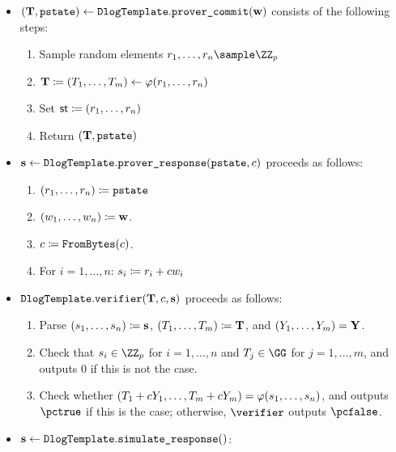 \documentclass[11pt]{article}
\begin{document}
\begin{itemize}
  \item\label{item:basic:p1}
   $(\mathbf {T}, \texttt{pstate}) \gets \texttt{DlogTemplate}.\texttt{prover\_commit}(\mathbf {w})$ consists of the following steps:
    \begin{enumerate}
      \item\label{item:basic:p1:randomness}
        Sample random elements $r_1,\dots,r_n\sample\ZZ_p$
      \item
         $\mathbf {T} \coloneqq (T_1,\dots,T_m)\gets\varphi(r_1,\dots,r_n)$
      \item Set $\mathsf{st}\coloneqq (r_1,\dots,r_n)$
      \item
        Return $(\mathbf {T},\texttt{pstate})$
    \end{enumerate}
  \item\label{item:basic:p2}
    $\mathbf {s} \gets \texttt{DlogTemplate}.\texttt{prover\_response}(\texttt{pstate},c)$ proceeds as follows:
    \begin{enumerate}
      \item  $(r_1,\dots,r_n)\coloneqq \texttt{pstate}$
      \item  $(w_1,\dots,w_n)\coloneqq \mathbf {w}$.
      \item
        $c \coloneqq \texttt{FromBytes}(c)$.
      \item For $i=1,\dots,n$: $s_i\coloneqq r_i+cw_i$
    \end{enumerate}
  \item\label{item:basic:v}
     $\texttt{DlogTemplate}.\texttt{verifier}(\mathbf {T},c,\mathbf {s})$ proceeds as follows:
    \begin{enumerate}
      \item Parse $(s_1, \dots, s_n) \coloneqq \mathbf {s}$, $(T_1, \dots, T_m) \coloneqq \mathbf {T}$, and $(Y_1, \dots, Y_m) = \mathbf {Y}$.
      \item\label{item:basic:v:checks}
        Check that $\response_i\in\ZZ_p$ for $i=1,\dots,n$ and $\commitment_j\in\GG$ for $j=1,\dots,m$, and outputs $0$ if this is not the case.
      \item Check whether $(T_1 + cY_1,\dots,T_m + cY_m) = \varphi(s_1,\dots,s_n)$, and outputs $\accept$ if this is the case; otherwise, $\verifier$ outputs $\reject$.
    \end{enumerate}
  \item $\mathbf {s} \gets \texttt{DlogTemplate}.\texttt{simulate\_response}()$:

\end{itemize}
\end{document}
